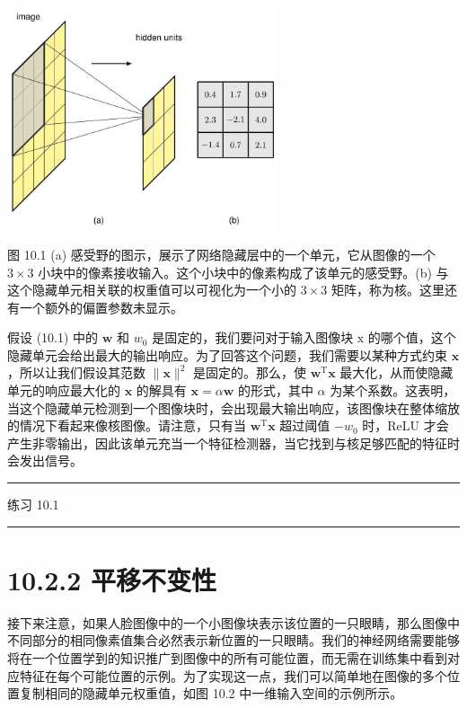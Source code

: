 \documentclass[10pt]{report}
\newcommand{\HRule}{\begin{center}\rule{0.9\linewidth}{0.2mm}\end{center}}
\begin{document}
\begin{center}
\includegraphics[max width=0.6\textwidth]{images/0194e279-9b28-703a-88f4-c3ac21e2010d_310_694_349_851_696_0.jpg}
\end{center}
\hspace*{3em} 

图 10.1 (a) 感受野的图示，展示了网络隐藏层中的一个单元，它从图像的一个 \(3 \times  3\) 小块中的像素接收输入。这个小块中的像素构成了该单元的感受野。(b) 与这个隐藏单元相关联的权重值可以可视化为一个小的 \(3 \times  3\) 矩阵，称为核。这里还有一个额外的偏置参数未显示。

假设 (10.1) 中的 \(\mathbf{w}\) 和 \({w}_{0}\) 是固定的，我们要问对于输入图像块 \(\mathrm{x}\) 的哪个值，这个隐藏单元会给出最大的输出响应。为了回答这个问题，我们需要以某种方式约束 \(\mathbf{x}\) ，所以让我们假设其范数 \(\parallel \mathbf{x}{\parallel }^{2}\) 是固定的。那么，使 \({\mathbf{w}}^{\mathrm{T}}\mathbf{x}\) 最大化，从而使隐藏单元的响应最大化的 \(\mathbf{x}\) 的解具有 \(\mathbf{x} = \alpha \mathbf{w}\) 的形式，其中 \(\alpha\) 为某个系数。这表明，当这个隐藏单元检测到一个图像块时，会出现最大输出响应，该图像块在整体缩放的情况下看起来像核图像。请注意，只有当 \({\mathbf{w}}^{\mathrm{T}}\mathbf{x}\) 超过阈值 \(- {w}_{0}\) 时，ReLU 才会产生非零输出，因此该单元充当一个特征检测器，当它找到与核足够匹配的特征时会发出信号。

\HRule

练习 10.1

\HRule

\section*{10.2.2 平移不变性}

接下来注意，如果人脸图像中的一个小图像块表示该位置的一只眼睛，那么图像中不同部分的相同像素值集合必然表示新位置的一只眼睛。我们的神经网络需要能够将在一个位置学到的知识推广到图像中的所有可能位置，而无需在训练集中看到对应特征在每个可能位置的示例。为了实现这一点，我们可以简单地在图像的多个位置复制相同的隐藏单元权重值，如图 10.2 中一维输入空间的示例所示。
\end{document}
